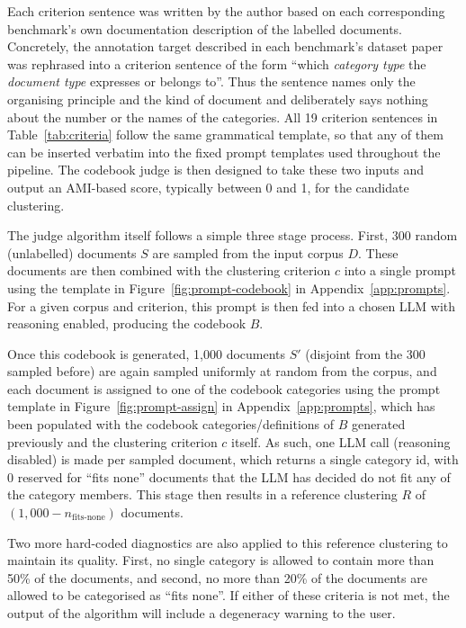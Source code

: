 \documentclass[11pt,a4paper,oneside]{report}
\begin{document}
Each criterion sentence was written by the author based on each corresponding benchmark's own documentation description of the labelled documents. Concretely, the annotation target described in each benchmark's dataset paper was rephrased into a criterion sentence of the form ``which \emph{category type} the \emph{document type} expresses or belongs to''. Thus the sentence names only the organising principle and the kind of document and deliberately says nothing about the number or the names of the categories. All 19 criterion sentences in Table~\ref{tab:criteria} follow the same grammatical template, so that any of them can be inserted verbatim into the fixed prompt templates used throughout the pipeline. The codebook judge is then designed to take these two inputs and output an AMI-based score, typically between 0 and 1, for the candidate clustering.

The judge algorithm itself follows a simple three stage process. First, 300 random (unlabelled) documents $S$ are sampled from the input corpus $D$. These documents are then combined with the clustering criterion $c$ into a single prompt using the template in Figure~\ref{fig:prompt-codebook} in Appendix~\ref{app:prompts}. For a given corpus and criterion, this prompt is then fed into a chosen LLM with reasoning enabled, producing the codebook $B$.

Once this codebook is generated, 1{,}000 documents $S'$ (disjoint from the 300 sampled before) are again sampled uniformly at random from the corpus, and each document is assigned to one of the codebook categories using the prompt template in Figure~\ref{fig:prompt-assign} in Appendix~\ref{app:prompts}, which has been populated with the codebook categories/definitions of $B$ generated previously and the clustering criterion $c$ itself. As such, one LLM call (reasoning disabled) is made per sampled document, which returns a single category id, with 0 reserved for ``fits none'' documents that the LLM has decided do not fit any of the category members. This stage then results in a reference clustering $R$ of $(1{,}000 - n_{\text{fits-none}})$ documents.

Two more hard-coded diagnostics are also applied to this reference clustering to maintain its quality. First, no single category is allowed to contain more than 50\% of the documents, and second, no more than 20\% of the documents are allowed to be categorised as ``fits none''. If either of these criteria is not met, the output of the algorithm will include a degeneracy warning to the user.
\end{document}
